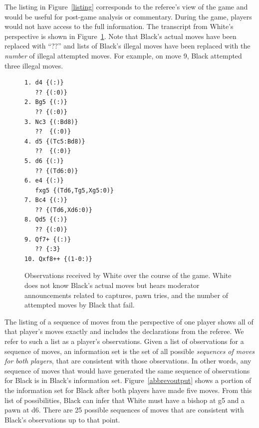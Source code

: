 \documentclass[10pt, conference, compsocconf]{IEEEtran}
\begin{document}
The listing in Figure~\ref{listing} corresponds to the referee's view of the game and would be useful for
post-game analysis or commentary.  During the game, players would not have access to the full information.  The
transcript from White's perspective is shown in Figure~\ref{filteredlisting}.  Note that Black's actual moves have been
replaced with ``??'' and lists of Black's illegal moves have been replaced with the {\em number} of illegal attempted
moves.  For example, on move 9, Black attempted three illegal moves.
\begin{figure}
\begin{verbatim}
1. d4 {(:)}
   ?? {(:0)}
2. Bg5 {(:)}
   ?? {(:0)}
3. Nc3 {(:Bd8)}
   ??  {(:0)}
4. d5 {(Tc5:Bd8)}
   ??  {(:0)}
5. d6 {(:)}
   ?? {(Td6:0)}
6. e4 {(:)}
   fxg5 {(Td6,Tg5,Xg5:0)}
7. Bc4 {(:)}
   ?? {(Td6,Xd6:0)}
8. Qd5 {(:)}
   ?? {(:0)}
9. Qf7+ {(:)} 
   ?? {:3}
10. Qxf8++ {(1-0:)}
\end{verbatim}
\caption{Observations received by White over the course of the game.  White does not know Black's actual moves but hears moderator announcements related to captures, pawn tries, and the number of attempted moves by Black that fail.}
\label{filteredlisting}
\vspace{-0.2in}
\end{figure}

The listing of a sequence of moves from the perspective of one player shows all of that player's moves exactly and
includes the declarations from the referee.  We refer to such a list as a player's observations.  Given a list of
observations for a sequence of moves, an information set is the set of all possible {\em sequences of moves for both
players}, that are consistent with those observations.  In other words, any sequence of moves that would have generated
the same sequence of observations for Black is in Black's information set.  Figure~\ref{abbrevoutput} shows a portion of the
information set for Black after both players have made five moves.  From this list of possibilities, Black can infer
that White must have a bishop at g5 and a pawn at d6.  There are 25 possible sequences of moves that are consistent with
Black's observations up to that point. 
\end{document}
